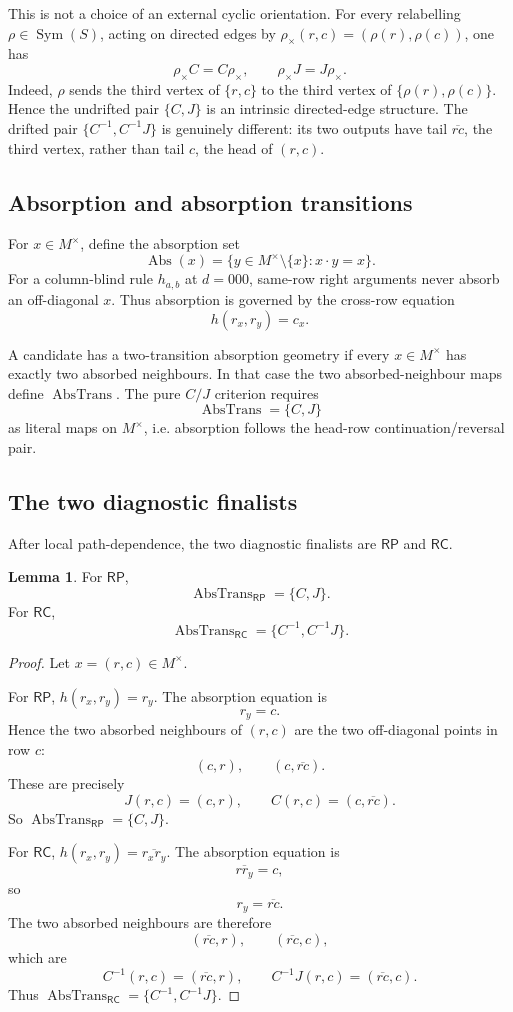 \documentclass[11pt]{article}
\theoremstyle{definition}
\newtheorem{lemma}[theorem]{Lemma}
\newcommand{\RP}{\mathsf{RP}}
\newcommand{\RC}{\mathsf{RC}}
\begin{document}
This is not a choice of an external cyclic orientation.  For every relabelling
\(\rho\in\operatorname{Sym}(S)\), acting on directed edges by
\(\rho_\times(r,c)=(\rho(r),\rho(c))\), one has
\[
\rho_\times C=C\rho_\times,
\qquad
\rho_\times J=J\rho_\times.
\]
Indeed, \(\rho\) sends the third vertex of \(\{r,c\}\) to the third vertex
of \(\{\rho(r),\rho(c)\}\).  Hence the undrifted pair \(\{C,J\}\) is an
intrinsic directed-edge structure.  The drifted pair
\(\{C^{-1},C^{-1}J\}\) is genuinely different: its two outputs have tail
\(\overline{rc}\), the third vertex, rather than tail \(c\), the head of
\((r,c)\).

\subsection{Absorption and absorption
transitions}\label{absorption-and-absorption-transitions}

For \(x\in M^\times\), define the absorption set \[
\operatorname{Abs}(x)=\{y\in M^\times\setminus\{x\}:x\cdot y=x\}.
\] For a column-blind rule \(h_{a,b}\) at \(d=000\), same-row right
arguments never absorb an off-diagonal \(x\). Thus absorption is
governed by the cross-row equation \[
h(r_x,r_y)=c_x.
\]

A candidate has a two-transition absorption geometry if every
\(x\in M^\times\) has exactly two absorbed neighbours. In that case the
two absorbed-neighbour maps define \(\operatorname{AbsTrans}\). The pure
\(C/J\) criterion requires \[
\operatorname{AbsTrans}=\{C,J\}
\] as literal maps on \(M^\times\), i.e. absorption follows the head-row
continuation/reversal pair.

\subsection{The two diagnostic finalists}\label{the-final-two-candidates}

After local path-dependence, the two diagnostic finalists are \(\RP\) and
\(\RC\).

\begin{lemma}
\label{lem:12.1}
For \(\RP\), \[
\operatorname{AbsTrans}_{\RP}=\{C,J\}.
\] For \(\RC\), \[
\operatorname{AbsTrans}_{\RC}=\{C^{-1},C^{-1}J\}.
\]
\end{lemma}

\begin{proof}
Let \(x=(r,c)\in M^\times\).

For \(\RP\), \(h(r_x,r_y)=r_y\). The absorption equation is \[
r_y=c.
\] Hence the two absorbed neighbours of \((r,c)\) are the two
off-diagonal points in row \(c\): \[
(c,r),
\qquad
(c,\overline{rc}).
\] These are precisely \[
J(r,c)=(c,r),
\qquad
C(r,c)=(c,\overline{rc}).
\] So \(\operatorname{AbsTrans}_{\RP}=\{C,J\}\).

For \(\RC\), \(h(r_x,r_y)=\overline{r_xr_y}\). The absorption
equation is \[
\overline{r r_y}=c,
\] so \[
r_y=\overline{rc}.
\] The two absorbed neighbours are therefore \[
(\overline{rc},r),
\qquad
(\overline{rc},c),
\] which are \[
C^{-1}(r,c)=(\overline{rc},r),
\qquad
C^{-1}J(r,c)=(\overline{rc},c).
\] Thus \(\operatorname{AbsTrans}_{\RC}=\{C^{-1},C^{-1}J\}\).
\end{proof}
\end{document}
